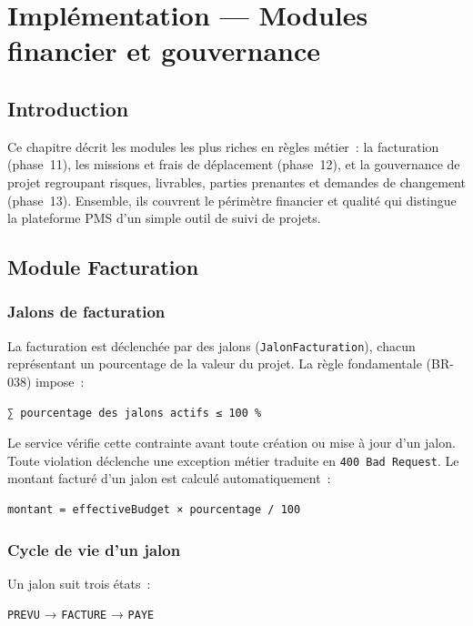 \chapter{Implémentation --- Modules financier et gouvernance}

\section*{Introduction}
Ce chapitre décrit les modules les plus riches en règles métier~: la facturation (phase~11), les
missions et frais de déplacement (phase~12), et la gouvernance de projet regroupant risques,
livrables, parties prenantes et demandes de changement (phase~13). Ensemble, ils couvrent le périmètre
financier et qualité qui distingue la plateforme PMS d'un simple outil de suivi de projets.

\section{Module Facturation}

\subsection{Jalons de facturation}

La facturation est déclenchée par des jalons (\texttt{JalonFacturation}), chacun représentant un
pourcentage de la valeur du projet. La règle fondamentale (BR-038) impose~:

\begin{verbatim}
∑ pourcentage des jalons actifs ≤ 100 %
\end{verbatim}

Le service vérifie cette contrainte avant toute création ou mise à jour d'un jalon. Toute violation
déclenche une exception métier traduite en \texttt{400 Bad Request}. Le montant facturé d'un jalon
est calculé automatiquement~:

\begin{verbatim}
montant = effectiveBudget × pourcentage / 100
\end{verbatim}

\subsection{Cycle de vie d'un jalon}

Un jalon suit trois états~:

\begin{center}
\texttt{PREVU} → \texttt{FACTURE} → \texttt{PAYE}
\end{center}

